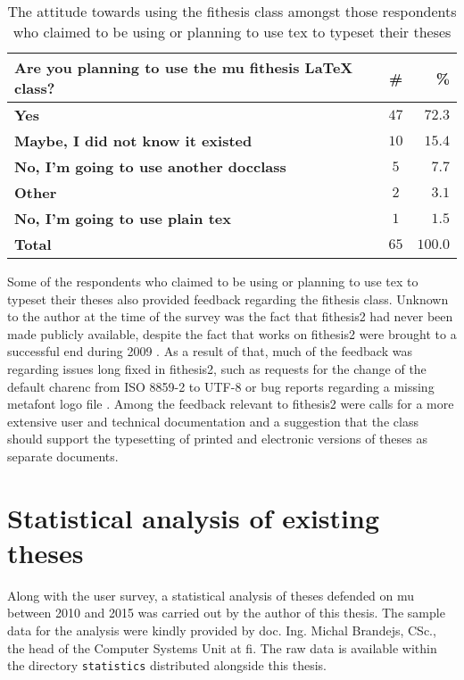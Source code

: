   \begin{table}
    \caption{The attitude towards using the fithesis class amongst those respondents who claimed to be using or planning to use \gls{tex} to typeset their theses}
    \begin{tabularx}{\textwidth}{Xcr}
      \textbf{Are you planning to use the \gls{mu} fithesis \LaTeX{} class?} & \textbf{\#} & \textbf{\%} \\
      \hline
      \textbf{Yes}                                         & $47$          & $72.3$ \\
      \textbf{Maybe, I did not know it existed}             & $10$          & $15.4$ \\
      \textbf{No, I'm going to use another \gls{docclass}} & $5$           &  $7.7$ \\
      \textbf{Other}                                       & $2$           &  $3.1$ \\
      \textbf{No, I'm going to use plain \gls{tex}}        & $1$           &  $1.5$ \\
      \hline
      \textbf{Total}                                       & \textbf{$65$} & \textbf{$100.0$}
    \end{tabularx}
    \label{table:survey-tex}
  \end{table}

  Some of the respondents who claimed to be using or planning to use \gls{tex} to typeset their theses also provided feedback regarding the fithesis class. Unknown to the author at the time of the survey was the fact that fithesis2 had never been made publicly available, despite the fact that works on fithesis2 were brought to a successful end during 2009 \cite{Filipcik09}. As a result of that, much of the feedback was regarding issues long fixed in fithesis2, such as requests for the change of the default \gls{charenc} from ISO 8859-2 to UTF-8 \cite[section~4.1]{Filipcik09} or bug reports regarding a missing metafont logo file \cite{fithesis2@fbd7a25}. Among the feedback relevant to fithesis2 were calls for a more extensive user and technical documentation\pending{} and a suggestion that the class should support the typesetting of printed and electronic versions of theses as separate documents\pending{}.

  \section{Statistical analysis of existing theses}
  Along with the user survey, a statistical analysis of theses defended on \gls{mu} between 2010 and 2015 was carried out by the author of this thesis. The sample data for the analysis were kindly provided by doc. Ing. Michal Brandejs, CSc., the head of the Computer Systems Unit at \gls{fi}. The raw data is available within the directory \texttt{statistics} distributed alongside this thesis.


